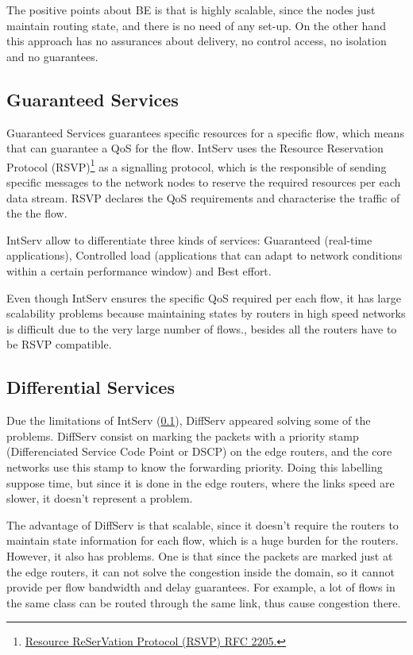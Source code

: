 The positive points about BE is that is highly scalable, since the nodes just maintain routing state, and there is no need of any set-up. On the other hand this approach has no assurances about delivery, no control access, no isolation and no guarantees. 

\subsection{Guaranteed Services}
\label{sec:intserv}

Guaranteed Services guarantees specific resources for a specific flow, which means that can guarantee a QoS for the flow. IntServ uses the Resource Reservation Protocol (RSVP)\footnote{\href{http://tools.ietf.org/html/rfc2205}{Resource ReSerVation Protocol (RSVP) RFC 2205.}} as a signalling protocol, which is the responsible of sending specific messages to the network nodes to reserve the required resources per each data stream. RSVP declares the QoS requirements and characterise the traffic of the the flow. 

IntServ allow to differentiate three kinds of services: Guaranteed (real-time applications), Controlled load (applications that can adapt to network conditions within a certain performance window) and Best effort.



Even though IntServ ensures the specific QoS required per each flow, it has large scalability problems because maintaining states by routers in high speed networks is difficult due to the very large number of flows., besides all the routers have to be RSVP compatible.   

\subsection{Differential Services}
\label{sec:diffserv}

Due the limitations of IntServ (\ref{sec:intserv}), DiffServ appeared solving some of the problems. DiffServ consist on marking the packets with a priority stamp (Differenciated Service Code Point or DSCP) on the edge routers, and the core networks use this stamp to know the forwarding priority. Doing this labelling suppose time, but since it is done in the edge routers, where the links speed are slower, it doesn't represent a problem.

The advantage of DiffServ is that scalable, since it doesn't require the routers to maintain state information for each flow, which is a huge burden for the routers. However, it also has problems. One is that since the packets are marked just at the edge routers, it can not solve the congestion inside the domain, so it cannot provide per flow bandwidth and delay guarantees. For example, a lot of flows in the same class can be routed through the same link, thus cause congestion there.

